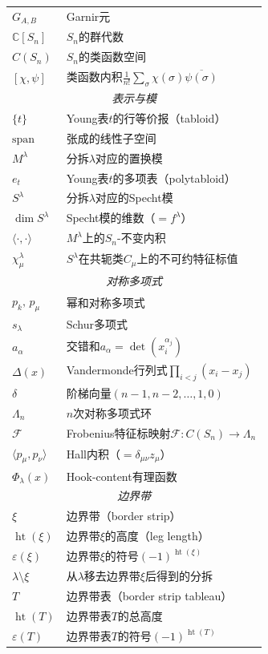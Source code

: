 \documentclass{sjtureport}
\begin{document}
{\begin{longtable}{p{3.2cm}p{\dimexpr\linewidth-3.4cm-4\tabcolsep\relax}}
    $G_{A,B}$ & Garnir元 \\
    $\mathbb{C}[S_n]$ & $S_n$的群代数 \\
    $C(S_n)$ & $S_n$的类函数空间 \\
    $[\chi,\psi]$ & 类函数内积$\frac{1}{n!}\sum_\sigma\chi(\sigma)\overline{\psi(\sigma)}$ \\ \hline
    \multicolumn{2}{c}{\textit{表示与模}} \\ \hline
    $\{t\}$ & Young表$t$的行等价报（tabloid） \\
    $\mathrm{span}$ & 张成的线性子空间 \\
    $M^\lambda$ & 分拆$\lambda$对应的置换模 \\
    $e_t$ & Young表$t$的多项表（polytabloid） \\
    $S^\lambda$ & 分拆$\lambda$对应的Specht模 \\
    $\dim S^\lambda$ & Specht模的维数（$=f^\lambda$） \\
    $\langle\cdot,\cdot\rangle$ & $M^\lambda$上的$S_n$-不变内积 \\
    $\chi^\lambda_\mu$ & $S^\lambda$在共轭类$C_\mu$上的不可约特征标值 \\ \hline
    \multicolumn{2}{c}{\textit{对称多项式}} \\ \hline
    $p_k,\,p_\mu$ & 幂和对称多项式 \\
    $s_\lambda$ & Schur多项式 \\
    $a_\alpha$ & 交错和$a_\alpha=\det(x_i^{\alpha_j})$ \\
    $\Delta(x)$ & Vandermonde行列式$\prod_{i<j}(x_i-x_j)$ \\
    $\delta$ & 阶梯向量$(n-1,n-2,\dots,1,0)$ \\
    $\Lambda_n$ & $n$次对称多项式环 \\
    $\mathcal{F}$ & Frobenius特征标映射$\mathcal{F}:C(S_n)\to\Lambda_n$ \\
    $\langle p_\mu,p_\nu\rangle$ & Hall内积（$=\delta_{\mu\nu}z_\mu$） \\
    $\Phi_\lambda(x)$ & Hook-content有理函数 \\ \hline
    \multicolumn{2}{c}{\textit{边界带}} \\ \hline
    $\xi$ & 边界带（border strip） \\
    $\operatorname{ht}(\xi)$ & 边界带$\xi$的高度（leg length） \\
    $\varepsilon(\xi)$ & 边界带$\xi$的符号$(-1)^{\operatorname{ht}(\xi)}$ \\
    $\lambda\setminus\xi$ & 从$\lambda$移去边界带$\xi$后得到的分拆 \\
    $T$ & 边界带表（border strip tableau） \\
    $\operatorname{ht}(T)$ & 边界带表$T$的总高度 \\
    $\varepsilon(T)$ & 边界带表$T$的符号$(-1)^{\operatorname{ht}(T)}$ \\ \hline
\end{longtable}
}
\end{document}
